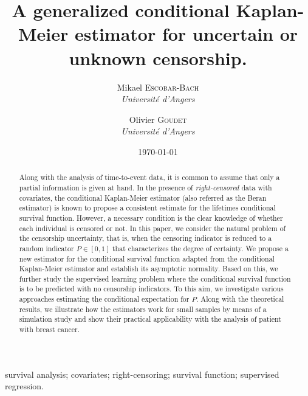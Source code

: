 \documentclass[12pt]{article}
\begin{document}
\title{\bf A generalized conditional Kaplan-Meier estimator for uncertain or unknown censorship.}

\author{
{\large Mikael E\textsc{scobar}-B\textsc{ach}} \\ {\it Universit\'e d'Angers} 
\and 
{\large Olivier G\textsc{oudet}} \\ {\it Universit\'e d'Angers}
}

\date{\today}

\maketitle

\begin{abstract}
Along with the analysis of time-to-event data, it is common to assume that only a partial information is given at hand. In the presence of \textit{right-censored} data with covariates, the conditional Kaplan-Meier estimator (also referred as the Beran estimator) is known to propose a consistent estimate for the lifetimes conditional survival function. However, a necessary condition is the clear knowledge of whether each individual is censored or not. In this paper, we consider the natural problem of the censorship uncertainty, that is, when the censoring indicator is reduced to a random indicator $P\in[0,1]$ that characterizes the degree of certainty. We propose a new estimator for the conditional survival function adapted from the conditional Kaplan-Meier estimator and establish its asymptotic normality. Based on this, we further study the supervised learning problem where the conditional survival function is to be predicted with no censorship indicators. To this aim, we investigate various approaches estimating the conditional expectation for $P$. Along with the theoretical results, we illustrate how the estimators work for small samples by means of a simulation study and show their practical applicability with the analysis of patient with breast cancer.       
\end{abstract}

\smallskip
{} survival analysis; covariates; right-censoring; survival function; supervised regression. 

\newpage
\end{document}
